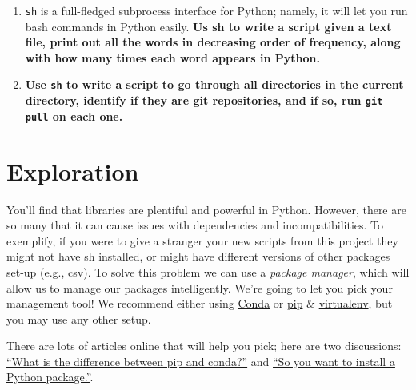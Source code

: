 \documentclass{article}
\begin{document}
\begin{enumerate} 
  \item \texttt{sh} is a full-fledged subprocess interface for Python; namely, it will let you run bash commands in Python easily. \textbf{Us sh to write a script given a text file, print out all the words in decreasing order of frequency, along with how many times each word appears in Python.}
  \vspace{5cm}

  \item \textbf{Use \texttt{sh} to write a script to go through all directories in the current directory, identify if they are git repositories, and if so, run \texttt{git pull} on each one.}
  \vspace{5cm}

\end{enumerate} 

\newpage
\section{Exploration}
You'll find that libraries are plentiful and powerful in Python. However, there are so many that it can cause issues with dependencies and incompatibilities. To exemplify, if you were to give a stranger your new scripts from this project they might not have sh installed, or might have different versions of other packages set-up (e.g., csv). To solve this problem we can use a \textit{package manager}, which will allow us to manage our packages intelligently. We're going to let you pick your management tool! We recommend either using \href{https://www.continuum.io/downloads}{Conda} or \href{https://pip.pypa.io/en/stable/}{pip} \& \href{https://virtualenv.pypa.io/en/latest/}{virtualenv}, but you may use any other setup.

There are lots of articles online that will help you pick; here are two discussions: \href{http://stackoverflow.com/questions/20994716/what-is-the-difference-between-pip-and-conda}{``What is the difference between pip and conda?''} and \href{http://dubroy.com/blog/so-you-want-to-install-a-python-package/}{``So you want to install a Python package.''}.
\end{document}
